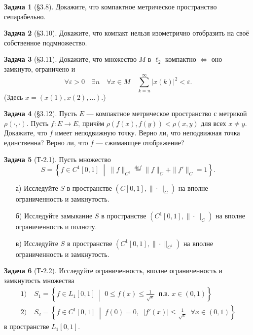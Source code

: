 \documentclass{article}
\theoremstyle{definition}
\newtheorem{problem}{Задача}
\newcommand{\eps}{\varepsilon}
\begin{document}
\begin{problem}[\S 3.8]
Докажите, что компактное метрическое пространство сепарабельно.
\end{problem}

\begin{problem}[\S 3.10]
Докажите, что компакт нельзя изометрично отобразить на своё собственное подмножество.
\end{problem}

\begin{problem}[\S 3.11]
Докажите, что множество $M$ в $\ell_2$ компактно $\Leftrightarrow$ оно замкнуто,
ограничено и 
\begin{equation*}
\forall \eps>0 \quad \exists n \quad \forall x\in M \quad \sum_{k=n}^\infty |x(k)|^2 < \eps.
\end{equation*}
(Здесь $x=(x(1), x(2), \ldots)$.) %
\end{problem}

\begin{problem}[\S 3.12]
Пусть $E$ --- компактное метрическое пространство с метрикой $\rho(\cdot, \cdot)$.
Пусть $f\colon E\to E$, причём $\rho(f(x),f(y))<\rho(x,y)$ для всех $x\ne y$.
Докажите, что $f$ имеет неподвижную точку.
Верно ли, что неподвижная точка единственна?
Верно ли, что $f$ --- сжимающее отображение?
\end{problem}

\begin{problem}[Т-2.1]
Пусть множество
\begin{equation*}
S=\left\{f\in C^1[0,1] \;\middle|\; \|f\|_{C^1} \overset{def}{=} \|f\|_C + \|f'\|_C = 1\right\}.
\end{equation*}
\begin{enumerate}
\item[а)] Исследуйте $S$ в пространстве $(C[0,1], \|\cdot\|_C)$ на вполне ограниченность и замкнутость.
\item[б)] Исследуйте замыкание $S$ в пространстве $(C^1[0,1], \|\cdot\|_C)$ на вполне ограниченность и полноту.
\item[в)] Исследуйте $S$ в пространстве $(C^1[0,1], \|\cdot\|_{C^1})$ на вполне ограниченность и замкнутость.
\end{enumerate}
\end{problem}

\begin{problem}[Т-2.2]
Исследуйте ограниченность, вполне ограниченность и замкнутость множества
\begin{equation*}
\begin{aligned}
1) \; & S_1 = \left\{f\in L_1[0,1] \;\middle|\; 0 \le f(x) \le \frac{1}{\sqrt{x}} \;\; \text{п.в. } x\in (0,1)\right\} \\
2) \; & S_2 = \left\{f\in C^1[0,1] \;\middle|\; f(0)=0, \;\; |f'(x)|\le \frac{1}{\sqrt{x}}\;\; \forall x\in (0,1)\right\}
\end{aligned}
\end{equation*}
в пространстве $L_1[0,1]$.
\end{problem}
\end{document}
